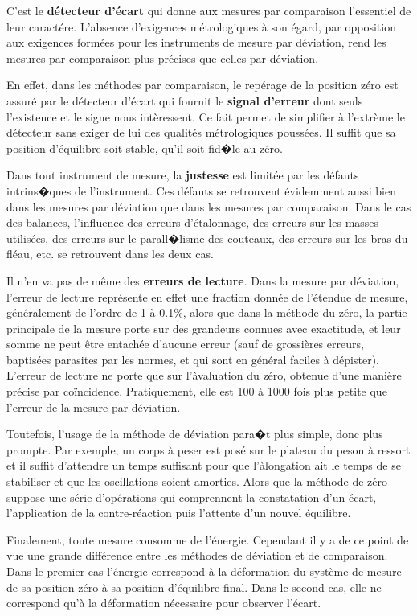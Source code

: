 C'est le \textbf{détecteur d'écart} qui donne aux mesures par comparaison l'essentiel de leur caractére. L'absence d'exigences métrologiques à son égard, par opposition aux exigences formées pour les instruments de mesure par déviation, rend les mesures par comparaison plus précises que celles par déviation.

En effet, dans les méthodes par comparaison, le repérage de la position zéro est assuré par le détecteur d'écart qui fournit le \textbf{signal d'erreur} dont seuls l'existence et le signe nous intèressent. Ce fait permet de simplifier à l'extrème le détecteur sans exiger de lui des qualités métrologiques poussées. Il suffit que sa position d'équilibre soit stable, qu'il soit fid�le au zéro.

Dans tout instrument de mesure, la \textbf{justesse} est limitée par les défauts intrins�ques de l'instrument. Ces défauts se retrouvent évidemment aussi bien dans les mesures par déviation que dans les mesures par comparaison. Dans le cas des balances, l'influence des erreurs d'étalonnage, des erreurs sur les masses utilisées, des erreurs sur le parall�lisme des couteaux, des erreurs sur les bras du fléau, etc. se retrouvent dans les deux cas.

Il n'en va pas de même des \textbf{erreurs de lecture}. Dans la mesure par déviation, l'erreur de lecture représente en effet une fraction donnée de l'étendue de mesure, généralement de l'ordre de 1 à 0.1\%, alors que dans la méthode du zéro, la partie principale de la mesure porte sur des grandeurs connues avec exactitude, et leur somme ne peut être entachée d'aucune erreur (sauf de grossières erreurs, baptisées parasites par les normes, et qui sont en général faciles à dépister). L'erreur de lecture ne porte que sur l'àvaluation du zéro, obtenue d'une manière précise par coïncidence. Pratiquement, elle est 100 à 1000 fois plus petite que l'erreur de la mesure par déviation.

Toutefois, l'usage de la méthode de déviation para�t plus simple, donc plus prompte. Par exemple, un corps à peser est posé sur le plateau du peson à ressort et il suffit d'attendre un temps suffisant pour que l'àlongation ait le temps de se stabiliser et que les oscillations soient amorties. Alors que la méthode de zéro suppose une série d'opérations qui comprennent la constatation d'un écart, l'application de la contre-réaction puis l'attente d'un nouvel équilibre.

Finalement, toute mesure consomme de l'énergie. Cependant il y a de ce point de vue une grande différence entre les méthodes de déviation et de comparaison. Dans le premier cas l'énergie correspond à la déformation du système de mesure de sa position zéro à sa position d'équilibre final. Dans le second cas, elle ne correspond qu'à la déformation nécessaire pour observer l'écart.

